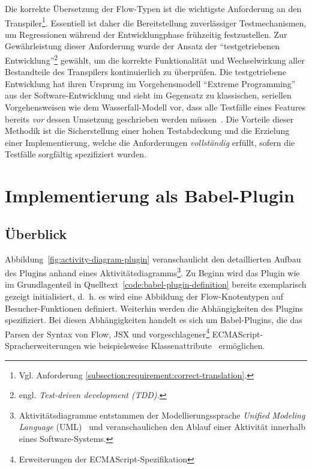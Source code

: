 Die korrekte Übersetzung der Flow-Typen ist die wichtigste Anforderung an den Transpiler\footnote{Vgl. Anforderung \ref{subsection:requirement:correct-translation}.}. Essentiell ist daher die Bereitstellung zuverlässiger Testmechanismen, um Regressionen während der Entwicklungphase frühzeitig festzustellen. Zur Gewährleistung dieser Anforderung wurde der Ansatz der \enquote{testgetriebenen Entwicklung}\footnote{engl. \textit{Test-driven development (TDD).}} gewählt, um die korrekte Funktionalität und Wechselwirkung aller Bestandteile des Transpilers kontinuierlich zu überprüfen. Die testgetriebene Entwicklung hat ihren Ursprung im Vorgehensmodell \enquote{Extreme Programming}~\autocite{JEFFRIES:EXTREME_PROGRAMMING} aus der Software-Entwicklung und sieht im Gegensatz zu klassischen, seriellen Vorgehensweisen wie dem Wasserfall-Modell vor, dass alle Testfälle eines Features bereits \emph{vor} dessen Umsetzung geschrieben werden müssen~\autocite{KENT:EXTREME_PROGRAMMING}. Die Vorteile dieser Methodik ist die Sicherstellung einer hohen Testabdeckung und die Erzielung einer Implementierung, welche die Anforderungen \emph{vollständig} erfüllt, sofern die Testfälle sorgfältig spezifiziert wurden.







\section{Implementierung als Babel-Plugin}
  \subsection{Überblick}

  Abbildung~\ref{fig:activity-diagram-plugin} veranschaulicht den detaillierten Aufbau des Plugins anhand eines Aktivitätsdiagramms\footnote{Aktivitätsdiagramme entstammen der Modellierungssprache \textit{Unified Modeling Language} (UML)~\autocite{OMG:UML} und veranschaulichen den Ablauf einer Aktivität innerhalb eines Software-Systems.}. Zu Beginn wird das Plugin wie im Grundlagenteil in Quelltext~\ref{code:babel-plugin-definition} bereits exemplarisch gezeigt initialisiert, d.~h. es wird eine Abbildung der Flow-Knotentypen auf Besucher-Funktionen definiert. Weiterhin werden die Abhängigkeiten des Plugins spezifiziert. Bei diesen Abhängigkeiten handelt es sich um Babel-Plugins, die das Parsen der Syntax von Flow, JSX und vorgeschlagener\footnote{Erweiterungen der ECMAScript-Spezifikation } ECMAScript-Spracherweiterungen wie beispielsweise Klassenattribute~\autocite{} ermöglichen.

